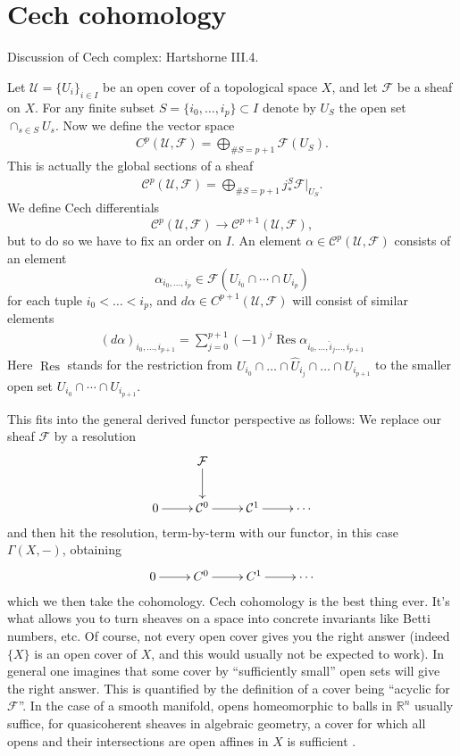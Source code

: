 \documentclass[12pt]{article}
\theoremstyle{plain}
\theoremstyle{definition}
\numberwithin{equation}{section}
\DeclareMathOperator{\res}{Res}
\newcommand{\R}{\mathbb{R}}
\newcommand{\CC}{\mathcal{C}}
\newcommand{\CF}{\mathcal{F}}
\newcommand{\CU}{\mathcal{U}}
\begin{document}
\section{Cech cohomology}


Discussion of Cech complex: Hartshorne III.4.

Let $\CU = \{U_i\}_{i \in I}$ be an open cover of a topological space $X$, and let $\CF$ be a sheaf on $X$. For any finite subset $S = \{i_0, \ldots, i_p\} \subset I$ denote by $U_S$ the open set $\cap_{s \in S} U_s$. Now we define the vector space
\begin{align*}
C^p(\CU, \CF) = \bigoplus_{\# S = p+1} \CF(U_S).
\end{align*}
This is actually the global sections of a sheaf
\begin{align*}
\CC^p(\CU, \CF) = \bigoplus_{\# S = p+1} j^S_* \CF|_{U_S}.
\end{align*}
We define Cech differentials
\[
\CC^p(\CU, \CF) \rightarrow \CC^{p+1}(\CU, \CF),
\]
but to do so we have to fix an order on $I$. An element $\alpha \in \CC^p(\CU, \CF)$ consists of an element
\[
\alpha_{i_0, \ldots, i_p} \in \CF(U_{i_0} \cap \cdots \cap U_{i_p})
\]
for each tuple $i_0 < \ldots < i_p$, and $d\alpha \in C^{p+1}(\CU, \CF)$ will consist of similar elements
\begin{align*}
(d\alpha)_{i_0, \ldots, i_{p+1}} = \sum_{j=0}^{p+1} (-1)^j \res \alpha_{i_0, \ldots, \widehat{i}_j \ldots, i_{p+1}}
\end{align*}
Here $\res$ stands for the restriction from $U_{i_0} \cap \ldots \cap \widehat{U}_{i_j} \cap \ldots \cap U_{i_{p+1}}$ to the smaller open set $U_{i_0} \cap \cdots \cap U_{i_{p+1}}$.

This fits into the general derived functor perspective as follows: We replace our sheaf $\CF$ by a resolution
\begin{align*}
\xymatrix{
 & \CF \ar@{->}[d] & \\
%
0 \ar@{->}[r] & \CC^0 \ar@{->}[r] & \CC^1 \ar@{->}[r] & \cdots \\
}
\end{align*}
and then hit the resolution, term-by-term with our functor, in this case $\Gamma(X, -)$, obtaining
\begin{align*}
\xymatrix{
0 \ar@{->}[r] & C^0 \ar@{->}[r] & C^1 \ar@{->}[r] & \cdots \\
}
\end{align*}
which we then take the cohomology. Cech cohomology is the best thing ever. It's what allows you to turn sheaves on a space into concrete invariants like Betti numbers, etc. Of course, not every open cover gives you the right answer (indeed $\{X\}$ is an open cover of $X$, and this would usually not be expected to work). In general one imagines that some cover by ``sufficiently small'' open sets will give the right answer. This is quantified by the definition of a cover being ``acyclic for $\CF$''. In the case of a smooth manifold, opens homeomorphic to balls in $\R^n$ usually suffice, for quasicoherent sheaves in algebraic geometry, a cover for which all opens and their intersections are open affines in $X$ is sufficient {\cite[Lemma 30.2.6]{stacks-project}}.
\end{document}
